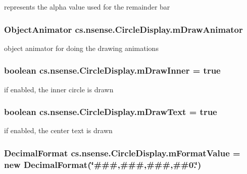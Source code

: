 represents the alpha value used for the remainder bar \hypertarget{classcs_1_1nsense_1_1_circle_display_af1ba69d043c26f35727b48ffec84bd40}{
\subsubsection[{m\-Draw\-Animator}]{\setlength{\rightskip}{0pt plus 5cm}Object\-Animator cs.\-nsense.\-Circle\-Display.\-m\-Draw\-Animator\hspace{0.3cm}{\ttfamily [private]}}}\label{classcs_1_1nsense_1_1_circle_display_af1ba69d043c26f35727b48ffec84bd40}
object animator for doing the drawing animations \hypertarget{classcs_1_1nsense_1_1_circle_display_a7963ce908095f857dabb9d8020d1df21}{
\subsubsection[{m\-Draw\-Inner}]{\setlength{\rightskip}{0pt plus 5cm}boolean cs.\-nsense.\-Circle\-Display.\-m\-Draw\-Inner = true\hspace{0.3cm}{\ttfamily [private]}}}\label{classcs_1_1nsense_1_1_circle_display_a7963ce908095f857dabb9d8020d1df21}
if enabled, the inner circle is drawn \hypertarget{classcs_1_1nsense_1_1_circle_display_a07b4d929124b30c8fc453ac0b0e17d70}{
\subsubsection[{m\-Draw\-Text}]{\setlength{\rightskip}{0pt plus 5cm}boolean cs.\-nsense.\-Circle\-Display.\-m\-Draw\-Text = true\hspace{0.3cm}{\ttfamily [private]}}}\label{classcs_1_1nsense_1_1_circle_display_a07b4d929124b30c8fc453ac0b0e17d70}
if enabled, the center text is drawn \hypertarget{classcs_1_1nsense_1_1_circle_display_a46e340a951601dc18e47b5f0979d862e}{
\subsubsection[{m\-Format\-Value}]{\setlength{\rightskip}{0pt plus 5cm}Decimal\-Format cs.\-nsense.\-Circle\-Display.\-m\-Format\-Value = new Decimal\-Format(\char`\"{}\#\#\#,\#\#\#,\#\#\#,\#\#0.\char`\"{})\hspace{0.3cm}{\ttfamily [private]}}}\label{classcs_1_1nsense_1_1_circle_display_a46e340a951601dc18e47b5f0979d862e}
